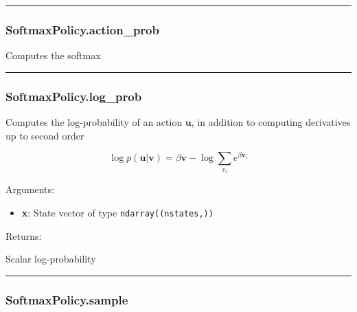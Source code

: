 \begin{center}\rule{0.5\linewidth}{\linethickness}\end{center}

\subsubsection{SoftmaxPolicy.action\_prob}\label{softmaxpolicy.action_prob}

\begin{Shaded}
\begin{Highlighting}[]
\end{Highlighting}
\end{Shaded}

Computes the softmax

\begin{center}\rule{0.5\linewidth}{\linethickness}\end{center}

\subsubsection{SoftmaxPolicy.log\_prob}\label{softmaxpolicy.log_prob}

\begin{Shaded}
\begin{Highlighting}[]
\end{Highlighting}
\end{Shaded}

Computes the log-probability of an action \(\mathbf u\), in addition to
computing derivatives up to second order

\[
\log p(\mathbf u|\mathbf v) = \beta \mathbf v - \log \sum_{v_i} e^{\beta \mathbf v_i}
\]

Arguments:

\begin{itemize}
\tightlist
\item
  \textbf{x}: State vector of type \texttt{ndarray((nstates,))}
\end{itemize}

Returns:

Scalar log-probability

\begin{center}\rule{0.5\linewidth}{\linethickness}\end{center}

\subsubsection{SoftmaxPolicy.sample}\label{softmaxpolicy.sample}

